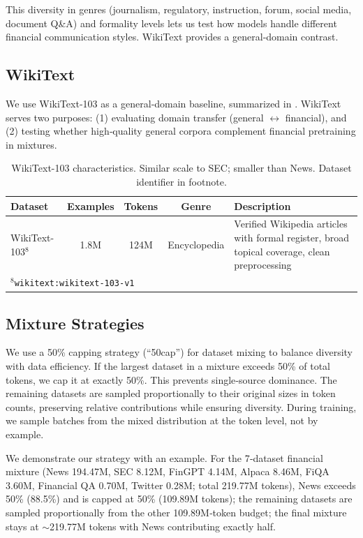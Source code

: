 This diversity in genres (journalism, regulatory, instruction, forum, social media, document Q\&A) and formality levels lets us test how models handle different financial communication styles. WikiText provides a general‑domain contrast.

\subsection{WikiText}

We use WikiText‑103 \parencite{merity2016pointer} as a general‑domain baseline, summarized in . WikiText serves two purposes: (1) evaluating domain transfer (general $\leftrightarrow$ financial), and (2) testing whether high‑quality general corpora complement financial pretraining in mixtures.

\begin{table}[h]
\centering
\caption[WikiText Dataset Characteristics]{WikiText-103 characteristics. Similar scale to SEC; smaller than News. Dataset identifier in footnote.}
\label{tab:wikitext_dataset}
\small
\begin{tabular}{p{3.4cm}cccp{5.5cm}}
\toprule
\textbf{Dataset} & \textbf{Examples} & \textbf{Tokens} & \textbf{Genre} & \textbf{Description} \\
\midrule
WikiText-103$^8$ & 1.8M & 124M & Encyclopedia & Verified Wikipedia articles with formal register, broad topical coverage, clean preprocessing \\
\bottomrule
\multicolumn{5}{l}{\footnotesize $^8$\texttt{wikitext:wikitext-103-v1}}
\end{tabular}
\end{table}

\subsection{Mixture Strategies}

We use a 50\% capping strategy (``50cap'') for dataset mixing to balance diversity with data efficiency. If the largest dataset in a mixture exceeds 50\% of total tokens, we cap it at exactly 50\%. This prevents single‑source dominance. The remaining datasets are sampled proportionally to their original sizes in token counts, preserving relative contributions while ensuring diversity. During training, we sample batches from the mixed distribution at the token level, not by example.

We demonstrate our strategy with an example. For the 7‑dataset financial mixture (News 194.47M, SEC 8.12M, FinGPT 4.14M, Alpaca 8.46M, FiQA 3.60M, Financial QA 0.70M, Twitter 0.28M; total 219.77M tokens), News exceeds 50\% (88.5\%) and is capped at 50\% (109.89M tokens); the remaining datasets are sampled proportionally from the other 109.89M‑token budget; the final mixture stays at $\sim$219.77M tokens with News contributing exactly half.

